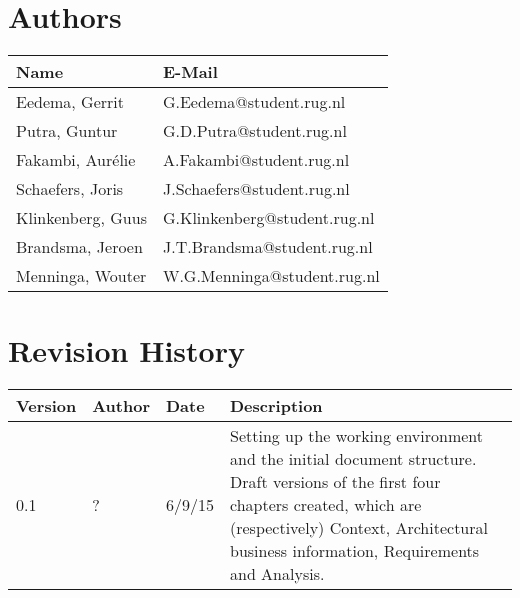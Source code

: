 \section*{Authors}

\begin{tabular}{ l l }
    \textbf{Name} & \textbf{E-Mail} \\ \hline
	Eedema, Gerrit & G.Eedema@student.rug.nl\\
	Putra, Guntur & G.D.Putra@student.rug.nl\\
	Fakambi, Aurélie & A.Fakambi@student.rug.nl\\
	Schaefers, Joris & J.Schaefers@student.rug.nl\\
	Klinkenberg, Guus & G.Klinkenberg@student.rug.nl\\
	Brandsma, Jeroen & J.T.Brandsma@student.rug.nl\\
	Menninga, Wouter & W.G.Menninga@student.rug.nl\\ \hline
\end{tabular}

\section*{Revision History}
\begin{tabular}{p{} p{} p{} p{}}
    \textbf{Version} & \textbf{Author} &  \textbf{Date} & \textbf{Description}\\ \hline
    0.1 & ? & 6/9/15 & Setting up the working environment and the initial document structure. Draft versions of the first four chapters created, which are (respectively) Context, Architectural business information, Requirements and Analysis. 
\end{tabular}